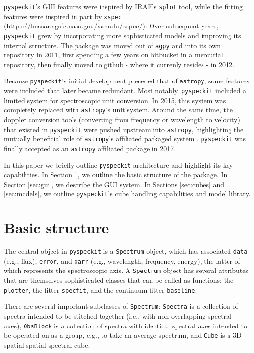 \documentclass[twocolumn]{aastex62}
\newcommand{\pyspeckit}{\texttt{pyspeckit}\xspace}
\newcommand{\astropy}{\texttt{astropy}\xspace}
\begin{document}
\pyspeckit's GUI features were inspired by IRAF's \texttt{splot} tool, while
the fitting features were inspired in part by \texttt{xspec}
(\url{https://heasarc.gsfc.nasa.gov/xanadu/xspec/}).  Over subsequent years,
\pyspeckit grew by incorporating more sophisticated models and improving its
internal structure.  The package was moved out of \texttt{agpy} and into its
own repository in 2011, first spending a few years on bitbucket in a mercurial
repository, then finally moved to github - where it currenly resides - in 2012.

Because \pyspeckit's initial development preceded that of \astropy, some features
were included that later became redundant.  Most notably, \pyspeckit included
a limited system for spectroscopic unit conversion.  In 2015, this system
was completely replaced with \astropy's unit system.  Around the same time,
the doppler conversion tools (converting from frequency or wavelength to 
velocity) that existed in \pyspeckit were pushed upstream into \astropy,
highlighting the mutually beneficial role of \astropy's affiliated
packaged system \citep{Price-Whelan2018a}.  \pyspeckit was finally
accepted as an \astropy affiliated package in 2017.


In this paper we briefly outline \texttt{pyspeckit} architecture and highlight
its key capabilities. In Section \ref{sec:basicstructure}, we  outline the
basic structure of the package.  In Section \ref{sec:gui}, we describe the GUI
system.  In Sections \ref{sec:cubes} and \ref{sec:models}, we outline
\pyspeckit's cube handling capabilities and model library. 



\section{Basic structure}
\label{sec:basicstructure}
The central object in \pyspeckit is a \texttt{Spectrum} object, which has
associated \texttt{data} (e.g., flux), \texttt{error}, and \texttt{xarr} (e.g., wavelength,
frequency, energy), the latter of
which represents the spectroscopic axis.  A \texttt{Spectrum} object has
several attributes that are themselves sophisticated classes that can be called
as functions: the \texttt{plotter}, the fitter \texttt{specfit}, and the
continuum fitter \texttt{baseline}.

There are several important subclasses of \texttt{Spectrum}: \texttt{Spectra}
is a collection of spectra intended to be stitched together (i.e., with
non-overlapping spectral axes), \texttt{ObsBlock} is a collection of spectra
with identical spectral axes intended to be operated on as a group, e.g., to
take an average spectrum, and \texttt{Cube} is a 3D spatial-spatial-spectral
cube.
\end{document}

